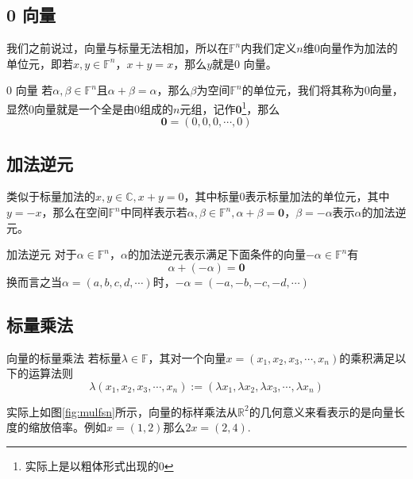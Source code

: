 \subsection{0 向量}

我们之前说过，向量与标量无法相加，所以在$\mathbb{F}^n$内我们定义$n$维0向量作为加法的单位元，即若$x,y\in \mathbb{F}^n$，$x+y=x$，那么$y$就是0 向量。

\begin{definition}{0 向量}
	若$\alpha,\beta \in \mathbb{F}^n$且$\alpha+\beta = \alpha$，那么$\beta$为空间$\mathbb{F}^n$的单位元，我们将其称为0向量，显然0向量就是一个全是由0组成的$n$元组，记作$\boldsymbol{0}$\footnote{实际上是以粗体形式出现的0}，那么$$\boldsymbol{0}=(0,0,0,\cdots,0)$$
\end{definition}

\subsection{加法逆元}

类似于标量加法的$x,y\in \mathbb{C},x+y=0$，其中标量0表示标量加法的单位元，其中$y=-x$，那么在空间$\mathbb{F}^n$中同样表示若$\alpha,\beta \in \mathbb{F}^n,\alpha+\beta=\boldsymbol{0}$，$\beta=-\alpha$表示$\alpha$的加法逆元。

\begin{definition}{加法逆元}
	对于$\alpha \in \mathbb{F}^n$，$\alpha$的加法逆元表示满足下面条件的向量$-\alpha\in \mathbb{F}^n$有$$\alpha+(-\alpha)=\boldsymbol{0}$$换而言之当$\alpha=(a,b,c,d,\cdots)$时，$-\alpha=(-a,-b,-c,-d,\cdots)$
\end{definition}

\subsection{标量乘法}

\begin{definition}{向量的标量乘法}
	\label{def:facmul}
	若标量$\lambda \in \mathbb{F}$，其对一个向量$x=(x_1,x_2,x_3,\cdots,x_n)$的乘积满足以下的运算法则$$\lambda(x_1,x_2,x_3,\cdots,x_n):=(\lambda x_1,\lambda x_2,\lambda x_3,\cdots,\lambda x_n)$$
\end{definition}

实际上如图\ref{fig:mulfsn}所示，向量的标样乘法从$\mathbb{R}^2$的几何意义来看表示的是向量长度的缩放倍率。例如$x=(1,2)$那么$2x=(2,4)$.

